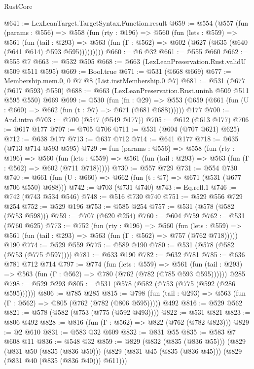 \begin{lexlean}{RustCore}
\begin{coremodule}
@641 := LexLeanTarget.TargetSyntax.Function.result
@659 := @554
    (@557
      (fun (params : @556) =>
      @558
        (fun (rty : @196) =>
        @560
          (fun (lets : @559) =>
          @561
            (fun (tail : @293) =>
            @563 (fun (Γ : @562) => @602 (@627 (@635 (@640 (@641 @614) @593 @595)))))))))
@660 := @6 @32
@661 := @555 @660
@662 := @555 @7
@663 := @532 @505
@668 := @663 (LexLeanPreservation.Rust.validU @509 @511 @595)
@669 := Bool.true
@671 := @531 (@668 @669)
@677 := Membership.mem.{0, 0} @7 @8 (List.instMembership.{0} @7)
@681 := @531 (@677 (@617 @593) @550)
@688 := @663 (LexLeanPreservation.Rust.uninh @509 @511 @595 @550) @669
@699 := @530
    (fun (fn : @29) =>
    @553 (@659 (@661 (fun (U : @660) => @662 (fun (t : @7) => @671 (@681 @688))))))
    @177
@700 := And.intro
@703 := @700 (@547 (@549 @177))
@705 := @612 (@613 @177)
@706 := @617 @177
@707 := @705 @706
@711 := @531 (@604 (@707 @621) @625)
@712 := @638 @177
@713 := @637 @712
@714 := @641 @177
@718 := @635 (@713 @714 @593 @595)
@729 := fun (params : @556) =>
  @558
    (fun (rty : @196) =>
    @560
      (fun (lets : @559) => @561 (fun (tail : @293) => @563 (fun (Γ : @562) => @602 (@711 @718)))))
@730 := @557 @729
@731 := @554 @730
@740 := @661 (fun (U : @660) => @662 (fun (t : @7) => @671 (@531 (@677 @706 @550) @688)))
@742 := @703 (@731 @740)
@743 := Eq.refl.{1}
@746 := @742 (@743 @534 @546)
@748 := @516 @730 @740
@751 := @529 @556 @729 @254
@752 := @529 @196
@753 := @585 @254
@757 := @531 (@578 (@582 (@753 @598)))
@759 := @707 (@620 @254)
@760 := @604 @759
@762 := @531 (@760 @625)
@773 := @752
    (fun (rty : @196) =>
    @560
      (fun (lets : @559) => @561 (fun (tail : @293) => @563 (fun (Γ : @562) => @757 (@762 @718)))))
    @190
@774 := @529 @559
@775 := @589 @190
@780 := @531 (@578 (@582 (@753 (@775 @597))))
@781 := @633 @190
@782 := @632 @781
@785 := @636 @781 @712 @714
@797 := @774
    (fun (lets : @559) =>
    @561 (fun (tail : @293) => @563 (fun (Γ : @562) => @780 (@762 (@782 (@785 @593 @595))))))
    @285
@798 := @529 @293
@805 := @531 (@578 (@582 (@753 (@775 (@592 (@286 @595))))))
@806 := @785 @285
@815 := @798 (fun (tail : @293) => @563 (fun (Γ : @562) => @805 (@762 (@782 (@806 @595))))) @492
@816 := @529 @562
@821 := @578 (@582 (@753 (@775 (@592 @493))))
@822 := @531 @821
@823 := @806 @492
@828 := @816 (fun (Γ : @562) => @822 (@762 (@782 @823)))
@829 := @2 @610
@831 := @583 @32 @609
@832 := @831 @55
@835 := @583 @7 @608 @11
@836 := @548 @32
@859 := @829
    (@832 (@835 (@836 @55)))
    (@829
      (@831 @50 (@835 (@836 @50)))
      (@829 (@831 @45 (@835 (@836 @45))) (@829 (@831 @40 (@835 (@836 @40))) @611)))

\end{coremodule}
\end{lexlean}
